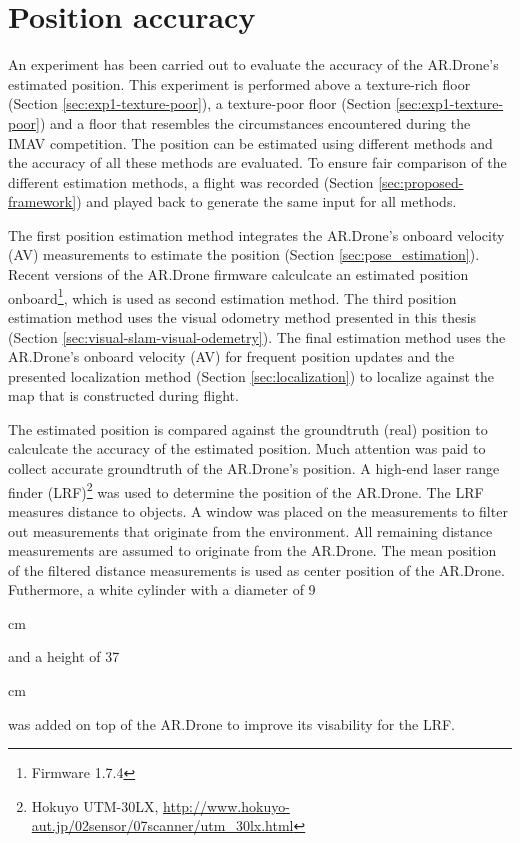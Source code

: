 \section{Position accuracy}
\label{sec:results-position-accuracy}
An experiment has been carried out to evaluate the accuracy of the AR.Drone's estimated position.
This experiment is performed above a texture-rich floor (Section \ref{sec:exp1-texture-poor}), a texture-poor floor (Section \ref{sec:exp1-texture-poor}) and a floor that resembles the circumstances encountered during the IMAV competition.
The position can be estimated using different methods and the accuracy of all these methods are evaluated.
To ensure fair comparison of the different estimation methods, a flight was recorded (Section \ref{sec:proposed-framework}) and played back to generate the same input for all methods.

The first position estimation method integrates the AR.Drone's onboard velocity (AV) measurements to estimate the position (Section \ref{sec:pose_estimation}).
Recent versions of the AR.Drone firmware calculcate an estimated position onboard\footnote{Firmware 1.7.4}, which is used as second estimation method.
The third position estimation method uses the visual odometry method presented in this thesis (Section \ref{sec:visual-slam-visual-odemetry}).
The final estimation method uses the AR.Drone's onboard velocity (AV) for frequent position updates and the presented localization method (Section \ref{sec:localization}) to localize against the map that is constructed during flight.

The estimated position is compared against the groundtruth (real) position to calculcate the accuracy of the estimated position.
Much attention was paid to collect accurate groundtruth of the AR.Drone's position.
A high-end laser range finder (LRF)\footnote{Hokuyo UTM-30LX, \url{http://www.hokuyo-aut.jp/02sensor/07scanner/utm_30lx.html}} was used to determine the position of the AR.Drone.
The LRF measures distance to objects.
A window was placed on the measurements to filter out measurements that originate from the environment.
All remaining distance measurements are assumed to originate from the AR.Drone.
The mean position of the filtered distance measurements is used as center position of the AR.Drone.
Futhermore, a white cylinder with a diameter of 9\begin{small}cm\end{small} and a height of 37\begin{small}cm\end{small} was added on top of the AR.Drone to improve its visability for the LRF.

